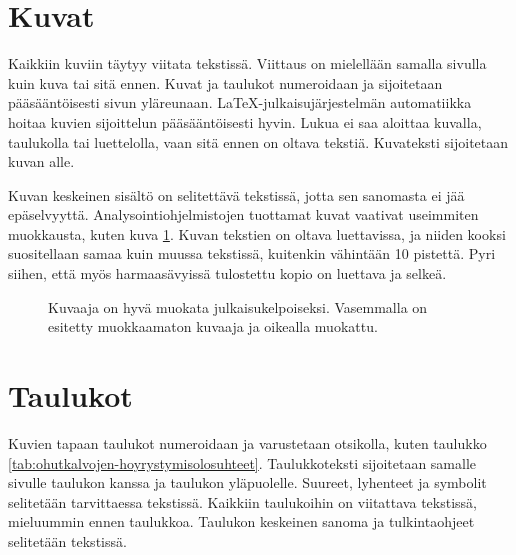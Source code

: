 \documentclass[globalnumbering,centeredcaptions,draftfooter]{tutthesis/tutthesis} %
\begin{document}
\section{Kuvat}

Kaikkiin kuviin täytyy viitata tekstissä.
Viittaus on mielellään samalla sivulla kuin kuva tai sitä ennen.
Kuvat ja taulukot numeroidaan ja sijoitetaan pääsääntöisesti sivun yläreunaan.
LaTeX-julkaisujärjestelmän automatiikka hoitaa kuvien sijoittelun pääsääntöisesti hyvin.
Lukua ei saa aloittaa kuvalla, taulukolla tai luettelolla, vaan sitä ennen on oltava tekstiä.
Kuvateksti sijoitetaan kuvan alle.

Kuvan keskeinen sisältö on selitettävä tekstissä, jotta sen sanomasta ei jää epäselvyyttä.
Analysointiohjelmistojen tuottamat kuvat vaativat useimmiten muokkausta, kuten kuva \ref{fig:kuvaajan-julkaisukelpoisuus}.
Kuvan tekstien on oltava luettavissa, ja niiden kooksi suositellaan samaa kuin muussa tekstissä, kuitenkin vähintään 10 pistettä.
Pyri siihen, että myös harmaasävyissä tulostettu kopio on luettava ja selkeä.

\begin{figure}
    \vspace*{5cm}
    \hfill{}
    \vspace*{5cm}
    \caption{Kuvaaja on hyvä muokata julkaisukelpoiseksi. Vasemmalla on esitetty muokkaamaton kuvaaja ja oikealla muokattu.}
    \label{fig:kuvaajan-julkaisukelpoisuus}
\end{figure}

\section{Taulukot}

Kuvien tapaan taulukot numeroidaan ja varustetaan otsikolla, kuten taulukko \ref{tab:ohutkalvojen-hoyrystymisolosuhteet}.
Taulukkoteksti sijoitetaan samalle sivulle taulukon kanssa ja taulukon yläpuolelle.
Suureet, lyhenteet ja symbolit selitetään tarvittaessa tekstissä.
Kaikkiin taulukoihin on viitattava tekstissä, mieluummin ennen taulukkoa.
Taulukon keskeinen sanoma ja tulkintaohjeet selitetään tekstissä. 
\end{document}
